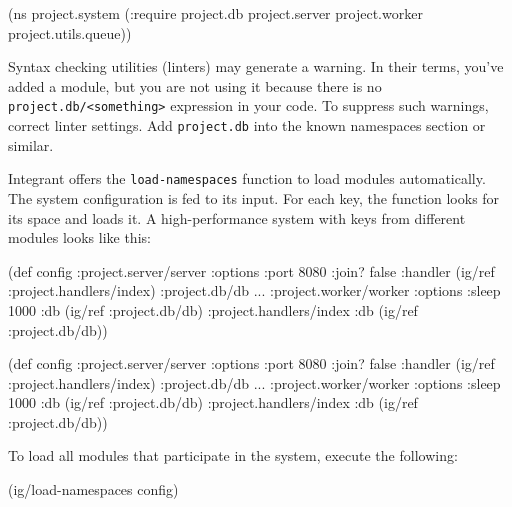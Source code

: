 \begin{english}
  \begin{clojure}
(ns project.system
  (:require project.db
            project.server
            project.worker
            project.utils.queue))
  \end{clojure}
\end{english}

Syntax checking utilities (linters) may generate a warning. In their terms, you've added a module, but you are not using it because there is no \verb|project.db/<something>| expression in your code. To suppress such warnings, correct linter settings. Add \verb|project.db| into the known namespaces section or similar.



Integrant offers the \verb|load-namespaces| function to load modules automatically. The system configuration is fed to its input. For each key, the function looks for its space and loads it. A high-performance system with keys from different modules looks like this:

\ifnarrow

\begin{english}
  \begin{clojure}
(def config
  {:project.server/server
   {:options {:port 8080 :join? false}
    :handler (ig/ref
               :project.handlers/index)}
   :project.db/db {...}
   :project.worker/worker
   {:options {:sleep 1000}
    :db      (ig/ref :project.db/db)}
   :project.handlers/index
   {:db (ig/ref :project.db/db)}})
  \end{clojure}
\end{english}

\else

\begin{english}
  \begin{clojure}
(def config
  {:project.server/server
   {:options {:port 8080 :join? false}
    :handler (ig/ref :project.handlers/index)}
   :project.db/db {...}
   :project.worker/worker
   {:options {:sleep 1000}
    :db      (ig/ref :project.db/db)}
   :project.handlers/index
   {:db (ig/ref :project.db/db)}})
  \end{clojure}
\end{english}

\fi

\noindent
To load all modules that participate in the system, execute the following:

\begin{english}
  \begin{clojure}
(ig/load-namespaces config)
  \end{clojure}
\end{english}

